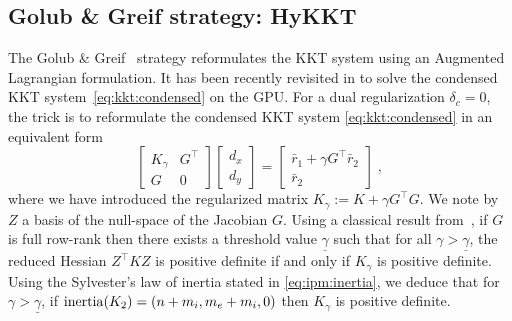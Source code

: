 \subsection{Golub \& Greif strategy: HyKKT}
\label{sec:kkt:golubgreif}
The Golub \& Greif~\cite{golub2003solving} strategy reformulates the KKT system
using an Augmented Lagrangian formulation.
It has been recently revisited in \cite{regev2023hykkt}
to solve the condensed KKT system~\eqref{eq:kkt:condensed} on the GPU.
For a dual regularization $\delta_c = 0$,
the trick is to reformulate the condensed KKT system \eqref{eq:kkt:condensed} in an equivalent form
\begin{equation}
  \label{eq:kkt:hykkt}
  \begin{bmatrix}
    K_\gamma & G^\top \\
    G & 0
  \end{bmatrix}
  \begin{bmatrix}
    d_x \\ d_y
  \end{bmatrix}
  =
  \begin{bmatrix}
    \bar{r}_1 + \gamma G^\top \bar{r}_2 \\
    \bar{r}_2
  \end{bmatrix} \; ,
\end{equation}
where we have introduced the regularized matrix $K_\gamma := K + \gamma G^\top G$.
We note by $Z$ a basis of the null-space of the Jacobian $G$.
Using a classical result from~\cite{debreu1952definite},
if $G$ is full row-rank then there
exists a threshold value $\underline{\gamma}$ such that
for all $\gamma > \underline{\gamma}$, the reduced Hessian $Z^\top K Z$
is positive definite if and only if $K_\gamma$ is positive definite.
Using the Sylvester's law of inertia stated in \eqref{eq:ipm:inertia}, we deduce
that for $\gamma > \underline{\gamma}$, if $\operatorname{inertia}(K_2) = (n + m_i, m_e +m_i, 0)$
then $K_\gamma$ is positive definite.

